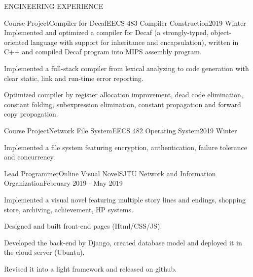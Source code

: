 \documentclass{resume} %
\begin{document}
\begin{rSection}{ENGINEERING EXPERIENCE}

\begin{rrsection}{Course Project}{Compiler for Decaf}{EECS 483
  Compiler Construction}{2019 Winter}
  Implemented and optimized a compiler for Decaf (a strongly-typed, object-oriented language with support for inheritance and
encapsulation), written in C++ and compiled Decaf program into MIPS assembly program.
  \item Implemented a full-stack compiler from lexical analyzing to code generation with clear static, link and run-time error reporting.
  \item Optimized compiler by register allocation improvement, dead code elimination, constant folding, subexpression elimination, constant propagation and forward copy propagation.

\end{rrsection}

\begin{rrsection}{Course Project}{Network File System}{EECS 482
  Operating System}{2019 Winter}
  \item Implemented a file system featuring encryption, authentication, failure tolerance and concurrency.
\end{rrsection}

\begin{rrsection}{Lead Programmer}{Online Visual Novel}{SJTU Network and Information Organization}{February 2019 - May 2019}

	\item Implemented a visual novel featuring multiple story lines and endings, shopping store, archiving, achievement, HP systems.

  \item Designed and built front-end pages (Html/CSS/JS).
  \item Developed the back-end by Django, created database model and deployed it in the cloud server (Ubuntu).
  \item Revised it into a light framework and released on github.
\end{rrsection}



\end{rSection}
\end{document}

